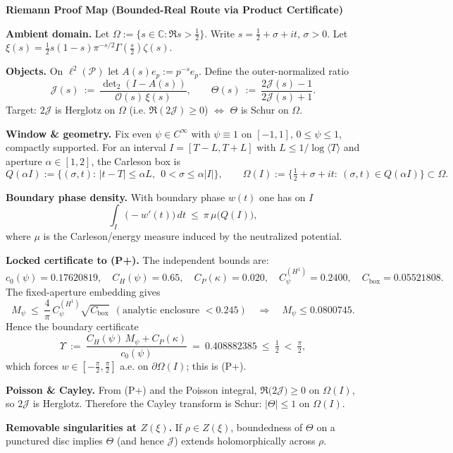 \documentclass[10pt]{article}
\newcommand{\czero}{0.17620819} %
\newcommand{\CH}{0.65}          %
\newcommand{\CP}{0.020}         %
\newcommand{\CHone}{0.2400}     %
\newcommand{\Cbox}{0.05521808}    %
\newcommand{\Mpsilocked}{0.0800745} %
\newcommand{\Ups}{0.408882385}  %
\begin{document}
\textbf{\large Riemann Proof Map (Bounded-Real Route via Product Certificate)}

\textbf{Ambient domain.} Let $\Omega:=\{s\in\mathbb C:\Re s>\tfrac12\}$. Write $s=\tfrac12+\sigma+it$, $\sigma>0$.
Let $\xi(s)=\tfrac12 s(1-s)\pi^{-s/2}\Gamma(\tfrac{s}{2})\zeta(s)$.

\textbf{Objects.} On $\ell^2(\mathcal P)$ let $A(s)e_p:=p^{-s}e_p$. Define the outer-normalized ratio
\[
  \mathcal J(s)\ :=\ \frac{\det\nolimits_2(I-A(s))}{\mathcal O(s)\,\xi(s)},
  \qquad
  \Theta(s)\ :=\ \frac{2\mathcal J(s)-1}{2\mathcal J(s)+1}.
\]
Target: $2\mathcal J$ is Herglotz on $\Omega$ (i.e. $\Re(2\mathcal J)\ge 0$) $\Longleftrightarrow$ $\Theta$ is Schur on $\Omega$.

\textbf{Window \& geometry.} Fix even $\psi\in C^\infty$ with $\psi\equiv1$ on $[-1,1]$, $0\le\psi\le1$, compactly supported.
For an interval $I=[T-L,T+L]$ with $L\le 1/\log\langle T\rangle$ and aperture $\alpha\in[1,2]$, the Carleson box is
\[
  Q(\alpha I):=\{(\sigma,t):\, |t-T|\le \alpha L,\ \ 0<\sigma\le \alpha|I|\},\qquad
  \Omega(I):=\{\tfrac12+\sigma+it:\ (\sigma,t)\in Q(\alpha I)\}\subset\Omega.
\]

\textbf{Boundary phase density.} With boundary phase $w(t)$ one has on $I$
\[
  \int_I \!\big(-w'(t)\big)\,dt \ \le\ \pi\,\mu\!\big(Q(I)\big),
\]
where $\mu$ is the Carleson/energy measure induced by the neutralized potential.

\textbf{Locked certificate to (P+).} The independent bounds are:
\[
  c_0(\psi)=\czero,\quad C_H(\psi)=\CH,\quad C_P(\kappa)=\CP,\quad
  C^{(H^1)}_\psi=\CHone,\quad C_{\mathrm{box}}=\Cbox.
\]
The fixed-aperture embedding gives
\[
  M_\psi\ \le\ \frac{4}{\pi}\,C^{(H^1)}_\psi\sqrt{C_{\mathrm{box}}}\ \ (\text{analytic enclosure }<0.245)
  \quad\Rightarrow\quad M_\psi\le \Mpsilocked.
\]
Hence the boundary certificate
\[
  \Upsilon\ :=\ \frac{C_H(\psi)\,M_\psi + C_P(\kappa)}{c_0(\psi)}\ =\ \Ups\ \le\ \tfrac12\ <\ \tfrac{\pi}{2},
\]
which forces $w\in[-\tfrac{\pi}{2},\tfrac{\pi}{2}]$ a.e. on $\partial\Omega(I)$; this is (P+).

\textbf{Poisson \& Cayley.} From (P+) and the Poisson integral, $\Re\big(2\mathcal J\big)\ge 0$ on $\Omega(I)$, so $2\mathcal J$ is Herglotz.
Therefore the Cayley transform is Schur: $|\Theta|\le1$ on $\Omega(I)$.

\textbf{Removable singularities at $Z(\xi)$.} If $\rho\in Z(\xi)$, boundedness of $\Theta$ on a punctured disc implies $\Theta$ (and hence $\mathcal J$) extends holomorphically across $\rho$.
\end{document}
